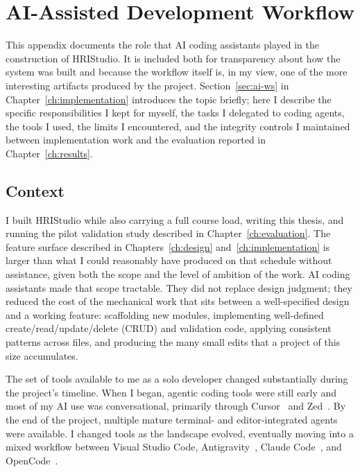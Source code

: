 \chapter{AI-Assisted Development Workflow}
\label{app:ai_workflow}

This appendix documents the role that AI coding assistants played in the construction of HRIStudio. It is included both for transparency about how the system was built and because the workflow itself is, in my view, one of the more interesting artifacts produced by the project. Section~\ref{sec:ai-ws} in Chapter~\ref{ch:implementation} introduces the topic briefly; here I describe the specific responsibilities I kept for myself, the tasks I delegated to coding agents, the tools I used, the limits I encountered, and the integrity controls I maintained between implementation work and the evaluation reported in Chapter~\ref{ch:results}.

\section{Context}
\label{sec:ai-context}

I built HRIStudio while also carrying a full course load, writing this thesis, and running the pilot validation study described in Chapter~\ref{ch:evaluation}. The feature surface described in Chapters~\ref{ch:design} and~\ref{ch:implementation} is larger than what I could reasonably have produced on that schedule without assistance, given both the scope and the level of ambition of the work. AI coding assistants made that scope tractable. They did not replace design judgment; they reduced the cost of the mechanical work that sits between a well-specified design and a working feature: scaffolding new modules, implementing well-defined create/read/update/delete (CRUD) and validation code, applying consistent patterns across files, and producing the many small edits that a project of this size accumulates.

The set of tools available to me as a solo developer changed substantially during the project's timeline. When I began, agentic coding tools were still early and most of my AI use was conversational, primarily through Cursor~\cite{CursorEditor} and Zed~\cite{ZedEditor}. By the end of the project, multiple mature terminal- and editor-integrated agents were available. I changed tools as the landscape evolved, eventually moving into a mixed workflow between Visual Studio Code, Antigravity~\cite{GoogleAntigravity}, Claude Code~\cite{AnthropicClaudeCode}, and OpenCode~\cite{OpenCode}.

